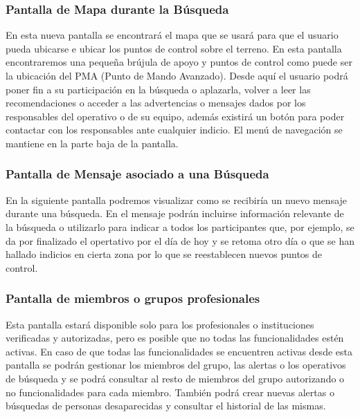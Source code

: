 
    \subsubsection{Pantalla de Mapa durante la Búsqueda}
    En esta nueva pantalla se encontrará el mapa que se usará para que el usuario pueda ubicarse e ubicar los puntos de control sobre el terreno. En esta pantalla encontraremos una pequeña brújula de apoyo y puntos de control como puede ser la ubicación del PMA (Punto de Mando Avanzado). Desde aquí el usuario podrá poner fin a su participación en la búsqueda o aplazarla, volver a leer las recomendaciones o acceder a las advertencias o mensajes dados por los responsables del operativo o de su equipo, además existirá un botón para poder contactar con los responsables ante cualquier indicio. El menú de navegación se mantiene en la parte baja de la pantalla.
    


    \subsubsection{Pantalla de Mensaje asociado a una Búsqueda}
    En la siguiente pantalla podremos visualizar como se recibiría un nuevo mensaje durante una búsqueda. En el mensaje podrán incluirse información relevante de la búsqueda o utilizarlo para indicar a todos los participantes que, por ejemplo, se da por finalizado el opertativo por el día de hoy y se retoma otro día o que se han hallado indicios en cierta zona por lo que se reestablecen nuevos puntos de control. 


    \subsubsection{Pantalla de miembros o grupos profesionales}
    Esta pantalla estará disponible solo para los profesionales o instituciones verificadas y autorizadas, pero es posible que no todas las funcionalidades estén activas. En caso de que todas las funcionalidades se encuentren activas desde esta pantalla se podrán gestionar los miembros del grupo, las alertas o los operativos de búsqueda y se podrá consultar al resto de miembros del grupo autorizando o no funcionalidades para cada miembro. También podrá crear nuevas alertas o búsquedas de personas desaparecidas y consultar el historial de las mismas.  
  
